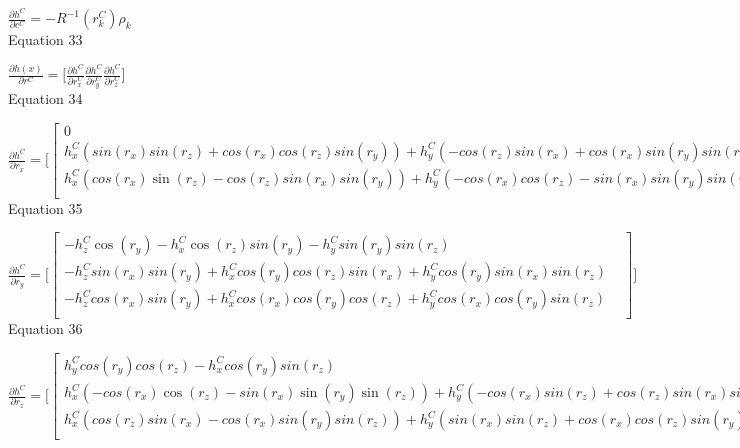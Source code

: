 $\frac{\partial h^{C}}{\partial c^{C}}=-R^{-1}(r_{k}^{C})\rho _{k}$\\


Equation 33

$\frac{\partial h(x)}{\partial r^{C}}=\lbrack \frac{\partial 
h^{C}}{\partial r_{x}^{C}}\frac{\partial h^{C}}{\partial 
r_{y}^{C}}\frac{\partial h^{C}}{\partial r_{z}^{C}}\rbrack $\\


Equation 34

$\frac{\partial h^{C}}{\partial r_{x}}=\lbrack \begin{bmatrix}
0 & \\

h_{x}^{C}(sin(r_{x})sin(r_{z})+cos(r_{x})cos(r_{z})sin(r_{y}))+h_{y}^{C}(-cos(r_{z})sin(r_{x})+cos(r_{x})sin(r_{y})sin(r_{z})) 
+ h_{z}^{C}cos(r_{x})cos(r_{y}) & \\
h_{x}^{C}(cos(r_{x})\sin 
(r_{z})-cos(r_{z})sin(r_{x})sin(r_{y}))+h_{y}^{C}(-cos(r_{x})cos(r_{z})-sin(r_{x})sin(r_{y})sin(r_{z})) 
- h_{z}^{C}cos(r_{y})sin(r_{x}) & \\
\end{bmatrix}
\rbrack $\\


Equation 35

$\frac{\partial h^{C}}{\partial r_{y}}=\lbrack \begin{bmatrix}
-h_{z}^{C}\cos (r_{y})- h_{x}^{C}\cos (r_{z})sin(r_{y})- 
h_{y}^{C}sin(r_{y})sin(r_{z}) & \\

-h_{z}^{C}sin(r_{x})sin(r_{y})+h_{x}^{C}cos(r_{y})cos(r_{z})sin(r_{x})+h_{y}^{C}cos(r_{y})sin(r_{x})sin(r_{z}) 
& \\

-h_{z}^{C}cos(r_{x})sin(r_{y})+h_{x}^{C}cos(r_{x})cos(r_{y})cos(r_{z})+h_{y}^{C}cos(r_{x})cos(r_{y})sin(r_{z}) 
& \\
\end{bmatrix}
\rbrack $\\


Equation 36

$\frac{\partial h^{C}}{\partial r_{z}}=\lbrack \begin{bmatrix}
h_{y}^{C}cos(r_{y})cos(r_{z})-h_{x}^{C}cos(r_{y})sin(r_{z}) & \\
h_{x}^{C}(-cos(r_{x})\cos (r_{z})- sin(r_{x})\sin (r_{y})\sin (r_{z}))+ 
h_{y}^{C}(-cos(r_{x})sin(r_{z})+cos(r_{z})sin(r_{x})sin(r_{y})) & \\

h_{x}^{C}(cos(r_{z})sin(r_{x})-cos(r_{x})sin(r_{y})sin(r_{z}))+h_{y}^{C}(sin(r_{x})sin(r_{z})+cos(r_{x})cos(r_{z})sin(r_{y})) 
& \\
\end{bmatrix}
\rbrack $\\


